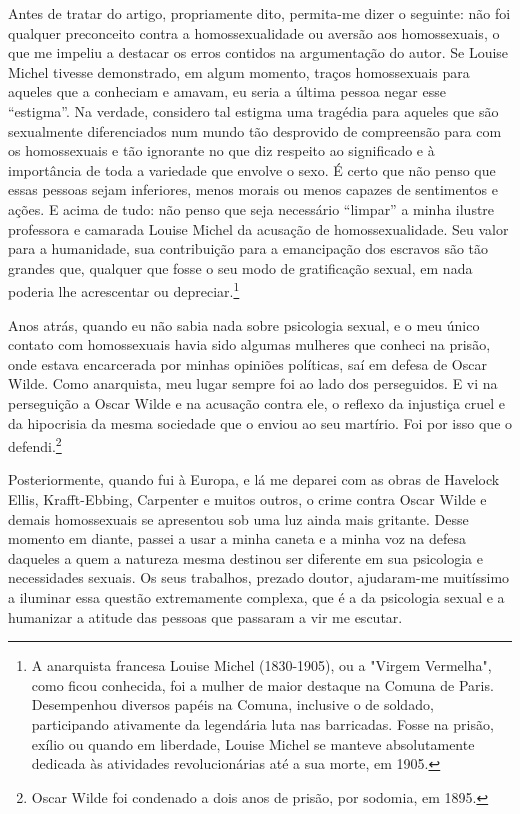 Antes de tratar do artigo, propriamente dito, permita-me dizer o
seguinte: não foi qualquer preconceito contra a homossexualidade ou
aversão aos homossexuais, o que me impeliu a destacar os erros contidos
na argumentação do autor. Se Louise Michel tivesse demonstrado, em algum
momento, traços homossexuais para aqueles que a conheciam e amavam, eu
seria a última pessoa negar esse ``estigma''. Na verdade, considero tal
estigma uma tragédia para aqueles que são sexualmente diferenciados num
mundo tão desprovido de compreensão para com os homossexuais e tão
ignorante no que diz respeito ao significado e à importância de toda a
variedade que envolve o sexo. É certo que não penso que essas pessoas
sejam inferiores, menos morais ou menos capazes de sentimentos e ações.
E acima de tudo: não penso que seja necessário ``limpar'' a minha
ilustre professora e camarada Louise Michel da acusação de
homossexualidade. Seu valor para a humanidade, sua contribuição para a
emancipação dos escravos são tão grandes que, qualquer que fosse o seu
modo de gratificação sexual, em nada poderia lhe acrescentar ou
depreciar.\footnote{A anarquista francesa Louise Michel (1830-1905), ou
  a "Virgem Vermelha", como ficou conhecida, foi a mulher de maior
  destaque na Comuna de Paris. Desempenhou diversos papéis na Comuna,
  inclusive o de soldado, participando ativamente da legendária luta nas
  barricadas. Fosse na prisão, exílio ou quando em liberdade, Louise
  Michel se manteve absolutamente dedicada às atividades revolucionárias
  até a sua morte, em 1905.}

Anos atrás, quando eu não sabia nada sobre psicologia sexual, e o meu
único contato com homossexuais havia sido algumas mulheres que conheci
na prisão, onde estava encarcerada por minhas opiniões políticas, saí em
defesa de Oscar Wilde. Como anarquista, meu lugar sempre foi ao lado dos
perseguidos. E vi na perseguição a Oscar Wilde e na acusação contra ele,
o reflexo da injustiça cruel e da hipocrisia da mesma sociedade que o
enviou ao seu martírio. Foi por isso que o defendi.\footnote{Oscar Wilde
  foi condenado a dois anos de prisão, por sodomia, em 1895.}

Posteriormente, quando fui à Europa, e lá me deparei com as obras de
Havelock Ellis, Krafft-Ebbing, Carpenter e muitos outros, o crime contra
Oscar Wilde e demais homossexuais se apresentou sob uma luz ainda mais
gritante. Desse momento em diante, passei a usar a minha caneta e a
minha voz na defesa daqueles a quem a natureza mesma destinou ser
diferente em sua psicologia e necessidades sexuais. Os seus trabalhos,
prezado doutor, ajudaram-me muitíssimo a iluminar essa questão
extremamente complexa, que é a da psicologia sexual e a humanizar a
atitude das pessoas que passaram a vir me escutar.

